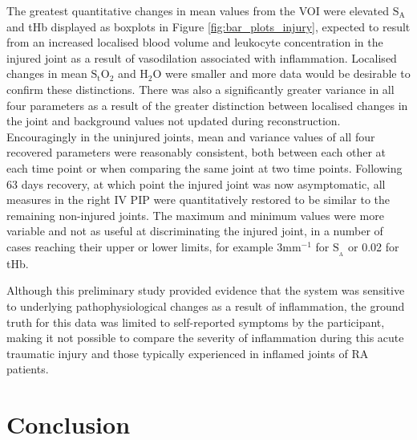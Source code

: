 \documentclass[twoside]{bhamthesis}
\theoremstyle{definition}
\begin{document}
The greatest quantitative changes in mean values from the VOI were elevated $\mathrm{S_A}$ and tHb displayed as boxplots in Figure \ref{fig:bar_plots_injury}, expected to result from an increased localised blood volume and leukocyte concentration in the injured joint as a result of vasodilation associated with inflammation. Localised changes in mean $\mathrm{S_tO_2}$ and $\mathrm{H_2O}$ were smaller and more data would be desirable to confirm these distinctions. There was also a significantly greater variance in all four parameters as a result of the greater distinction between localised changes in the joint and background values not updated during reconstruction. Encouragingly in the uninjured joints, mean and variance values of all four recovered parameters were reasonably consistent, both between each other at each time point or when comparing the same joint at two time points. Following 63 days recovery, at which point the injured joint was now asymptomatic, all measures in the right IV PIP were quantitatively restored to be similar to the remaining non-injured joints. The maximum and minimum values were more variable and not as useful at discriminating the injured joint, in a number of cases reaching their upper or lower limits, for example 3mm$^{-1}$ for $\mathrm{S_{_A}}$ or 0.02 for tHb.
 
Although this preliminary study provided evidence that the system was sensitive to underlying pathophysiological changes as a result of inflammation, the ground truth for this data was limited to self-reported symptoms by the participant, making it not possible to compare the severity of inflammation during this acute traumatic injury and those typically experienced in inflamed joints of RA patients.

\section{Conclusion}
\end{document}
